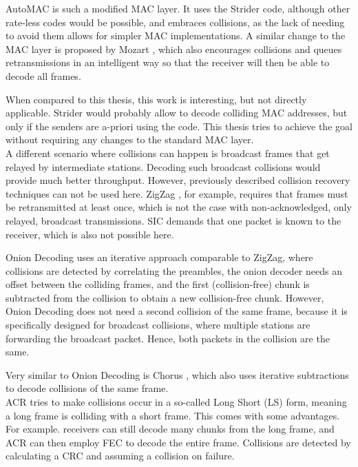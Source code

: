 AutoMAC \cite{gudipati2012} is such a modified MAC layer. It uses the Strider code, although other rate-less codes would be possible, and embraces collisions, as the lack of needing to avoid them allows for simpler MAC implementations. A similar change to the MAC layer is proposed by Mozart \cite{bansal2013}, which also encourages collisions and queues retransmissions in an intelligent way so that the receiver will then be able to decode all frames.

When compared to this thesis, this work is interesting, but not directly applicable. Strider would probably allow to decode colliding MAC addresses, but only if the senders are a-priori using the code. This thesis tries to achieve the goal without requiring any changes to the standard MAC layer.\\

A different scenario where collisions can happen is broadcast frames that get relayed by intermediate stations. Decoding  such broadcast collisions would provide much better throughput. However, previously described collision recovery techniques can not be used here. ZigZag \cite{gollakota2008}, for example, requires that frames must be retransmitted at least once, which is not the case with non-acknowledged, only relayed, broadcast transmissions. \gls{SIC} \cite{patel1994} demands that one packet is known to the receiver, which is also not possible here.

Onion Decoding \cite{wang2010} uses an iterative approach  comparable to ZigZag, where collisions are detected by correlating the preambles, the onion decoder needs an offset between the colliding frames, and the first (collision-free) chunk is subtracted from the collision to obtain a new collision-free chunk. However, Onion Decoding does not need a second collision of the same frame, because it is specifically designed for broadcast collisions, where multiple stations are forwarding the broadcast packet. Hence, both packets in the collision are the same.

Very similar to Onion Decoding is Chorus \cite{zhang2010}, which also uses iterative subtractions to decode collisions of the same frame.\\

\gls{ACR} \cite{wu2010} tries to make collisions occur in a so-called Long Short (LS) form, meaning a long frame is colliding with a short frame. This comes with some advantages. For example. receivers can still decode many chunks from the long frame, and \gls{ACR} can then employ \gls{FEC} to decode the entire frame. Collisions are detected by calculating a \gls{CRC} and assuming a collision on failure.

